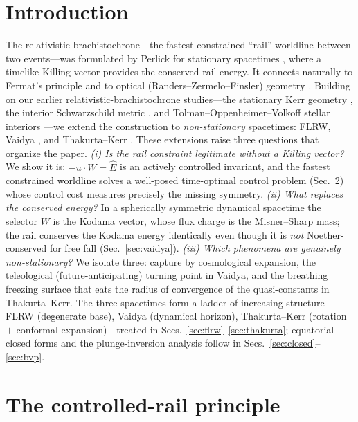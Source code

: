 \documentclass[
    aps, prd, twocolumn, superscriptaddress,
    showpacs, nofootinbib, floatfix
]{revtex4-2}
\newcommand{\Ehat}{\hat E}
\begin{document}
\section{Introduction}
\label{sec:intro}
The relativistic brachistochrone---the fastest constrained ``rail'' worldline
between two events---was formulated by Perlick for stationary spacetimes
\cite{Perlick1991,PerlickRayOptics}, where a timelike Killing vector provides
the conserved rail energy. It connects naturally to Fermat's principle and to
optical (Randers--Zermelo--Finsler) geometry
\cite{Kovner1990,Randers1941,GibbonsWerner2008,GibbonsRanders2009,BaoRoblesShen}.
Building on our earlier relativistic-brachistochrone studies---the stationary
Kerr geometry \cite{RosignoliKerr}, the interior Schwarzschild metric
\cite{RosignoliIntSchw}, and Tolman--Oppenheimer--Volkoff stellar interiors
\cite{RosignoliTOV}---we extend the construction to \emph{non-stationary}
spacetimes: FLRW, Vaidya \cite{Vaidya1951}, and Thakurta--Kerr
\cite{Thakurta1981}.
These extensions raise three questions that organize the paper.
\emph{(i) Is the rail constraint legitimate without a Killing vector?} We show it
is: $-u\cdot W=\Ehat$ is an actively controlled invariant, and the fastest
constrained worldline solves a well-posed time-optimal control problem
(Sec.~\ref{sec:principle}) whose control cost measures precisely the missing
symmetry. \emph{(ii) What replaces the conserved energy?} In a spherically
symmetric dynamical spacetime the selector $W$ is the Kodama vector, whose flux
charge is the Misner--Sharp mass; the rail conserves the Kodama energy
identically even though it is \emph{not} Noether-conserved for free fall
(Sec.~\ref{sec:vaidya}). \emph{(iii) Which phenomena are genuinely
non-stationary?} We isolate three: capture by cosmological expansion, the
teleological (future-anticipating) turning point in Vaidya, and the breathing
freezing surface that eats the radius of convergence of the quasi-constants in
Thakurta--Kerr. The three spacetimes form a ladder of increasing structure---%
FLRW (degenerate base), Vaidya (dynamical horizon), Thakurta--Kerr
(rotation $+$ conformal expansion)---treated in
Secs.~\ref{sec:flrw}--\ref{sec:thakurta}; equatorial closed forms and the
plunge-inversion analysis follow in Secs.~\ref{sec:closed}--\ref{sec:bvp}.


\section{The controlled-rail principle}
\label{sec:principle}
\end{document}
